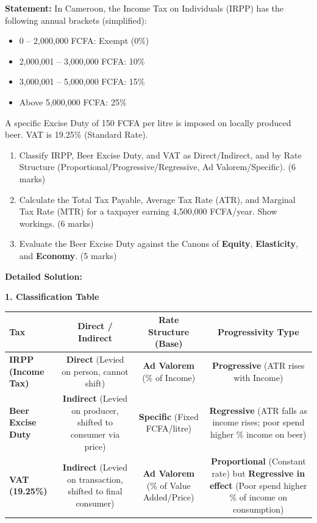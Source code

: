 \documentclass[11pt]{article}
\begin{document}
\begin{exoresolu}
\textbf{Statement:}
In Cameroon, the Income Tax on Individuals (IRPP) has the following annual brackets (simplified):
\begin{itemize}
    \item 0 -- 2,000,000 FCFA: Exempt (0\%)
    \item 2,000,001 -- 3,000,000 FCFA: 10\%
    \item 3,000,001 -- 5,000,000 FCFA: 15\%
    \item Above 5,000,000 FCFA: 25\%
\end{itemize}
A specific Excise Duty of 150 FCFA per litre is imposed on locally produced beer. VAT is 19.25\% (Standard Rate).
\begin{enumerate}
    \item Classify IRPP, Beer Excise Duty, and VAT as Direct/Indirect, and by Rate Structure (Proportional/Progressive/Regressive, Ad Valorem/Specific). (6 marks)
    \item Calculate the Total Tax Payable, Average Tax Rate (ATR), and Marginal Tax Rate (MTR) for a taxpayer earning 4,500,000 FCFA/year. Show workings. (6 marks)
    \item Evaluate the Beer Excise Duty against the Canons of \textbf{Equity}, \textbf{Elasticity}, and \textbf{Economy}. (5 marks)
\end{enumerate}
\tcblower
\textbf{Detailed Solution:}

\textbf{1. Classification Table}

\begin{center}
\begin{tabular}{|l|c|c|c|}
\hline
\rowcolor{popblueL} \textbf{Tax} & \textbf{Direct / Indirect} & \textbf{Rate Structure (Base)} & \textbf{Progressivity Type} \\
\hline
\textbf{IRPP (Income Tax)} & \textbf{Direct} (Levied on person, cannot shift) & \textbf{Ad Valorem} (\% of Income) & \textbf{Progressive} (ATR rises with Income) \\
\hline
\textbf{Beer Excise Duty} & \textbf{Indirect} (Levied on producer, shifted to consumer via price) & \textbf{Specific} (Fixed FCFA/litre) & \textbf{Regressive} (ATR falls as income rises; poor spend higher \% income on beer) \\
\hline
\textbf{VAT (19.25\%)} & \textbf{Indirect} (Levied on transaction, shifted to final consumer) & \textbf{Ad Valorem} (\% of Value Added/Price) & \textbf{Proportional} (Constant rate) but \textbf{Regressive in effect} (Poor spend higher \% of income on consumption) \\
\hline
\end{tabular}
\end{center}


\end{exoresolu}
\end{document}
